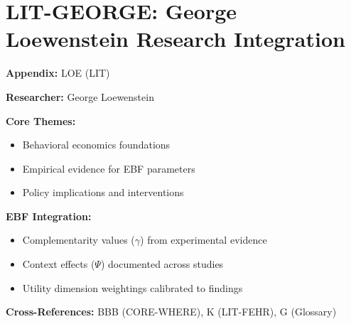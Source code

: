 %
%

\chapter{LIT-GEORGE: George Loewenstein Research Integration}
\label{app:loe}

\begin{abstract}
This appendix integrates the research contributions of George Loewenstein into the
Evidence-Based Framework. It documents key papers, core findings, and their
integration with EBF dimensions including complementarity parameters ($\gamma$),
context factors ($\Psi$), and utility dimensions.
\end{abstract}

\begin{tcolorbox}[colback=blue!5!white, colframe=blue!75!black,
    title=Quick Reference: George Loewenstein Research]

\textbf{Appendix:} LOE (LIT)

\textbf{Researcher:} George Loewenstein

\textbf{Core Themes:}
\begin{itemize}[nosep]
\item Behavioral economics foundations
\item Empirical evidence for EBF parameters
\item Policy implications and interventions
\end{itemize}

\textbf{EBF Integration:}
\begin{itemize}[nosep]
\item Complementarity values ($\gamma$) from experimental evidence
\item Context effects ($\Psi$) documented across studies
\item Utility dimension weightings calibrated to findings
\end{itemize}

\textbf{Cross-References:} BBB (CORE-WHERE), K (LIT-FEHR), G (Glossary)
\end{tcolorbox}

